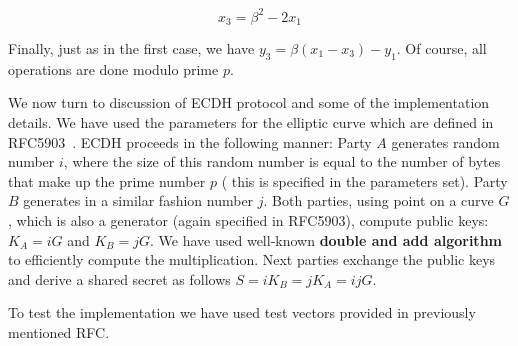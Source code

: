$$x_3=\beta^2-2x_1$$

Finally, just as in the first case, we have 
$y_3=\beta(x_1-x_3) - y_1$. Of course, all 
operations are done modulo prime $p$.

We now turn to discussion of ECDH protocol and some of the implementation
details. We have used the parameters for the elliptic curve which are 
defined in RFC5903~\cite{RFC5903}. ECDH proceeds in the following manner:
Party $A$ generates random number $i$, where the size of this random number 
is equal to the number of bytes that make up the prime number $p$ (
this is specified in the parameters set). Party $B$ generates in 
a similar fashion number $j$. Both parties, using point on a curve $
G$, which is also a generator (again specified in RFC5903), compute public keys:
$K_A = iG$ and $K_B=jG$. We have used well-known {\bf double and add algorithm}~\cite{stinson} 
to efficiently compute the multiplication. Next parties exchange the public keys and
derive a shared secret as follows $S=iK_B=jK_A=ijG$.

To test the implementation we have used test vectors provided in
previously mentioned RFC.
